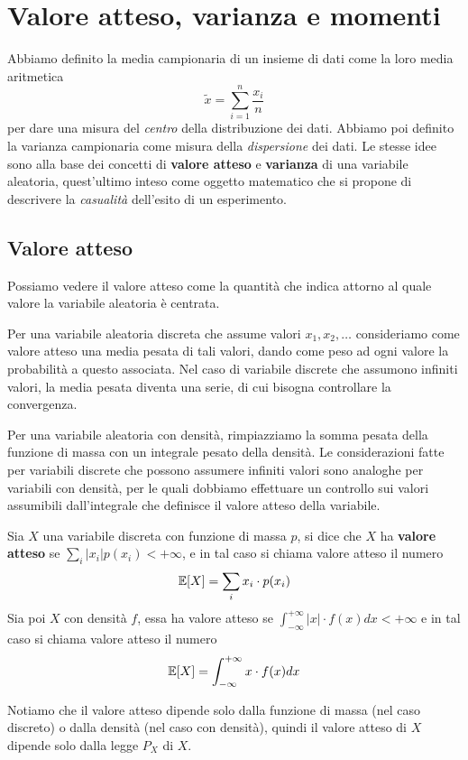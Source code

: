\section{Valore atteso, varianza e momenti}
Abbiamo definito la media campionaria di un insieme di dati come la loro media aritmetica
\[ \tilde{x} = \sum_{i=1}^n \frac{x_i}{n} \]
per dare una misura del \emph{centro} della distribuzione dei dati. Abbiamo poi definito la
varianza campionaria come misura della \emph{dispersione} dei dati. Le stesse idee sono alla base
dei concetti di \textbf{valore atteso} e \textbf{varianza} di una variabile aleatoria, quest'ultimo
inteso come oggetto matematico che si propone di descrivere la \emph{casualità} dell'esito di un
esperimento.

\subsection{Valore atteso}
Possiamo vedere il valore atteso come la quantità che indica attorno al quale valore la variabile
aleatoria è centrata.

Per una variabile aleatoria discreta che assume valori $x_1, x_2, \dots$ consideriamo come valore
atteso una media pesata di tali valori, dando come peso ad ogni valore la probabilità a questo
associata. Nel caso di variabile discrete che assumono infiniti valori, la media pesata diventa
una serie, di cui bisogna controllare la convergenza.

Per una variabile aleatoria con densità, rimpiazziamo la somma pesata della funzione di massa con
un integrale pesato della densità. Le considerazioni fatte per variabili discrete che possono
assumere infiniti valori sono analoghe per variabili con densità, per le quali dobbiamo effettuare
un controllo sui valori assumibili dall'integrale che definisce il valore atteso della variabile.

\begin{definition}
	Sia $X$ una variabile discreta con funzione di massa $p$, si dice che $X$ ha
	\textbf{valore atteso} se $\sum_i |x_i| p(x_i) < +\infty$, e in tal caso si chiama valore
	atteso il numero
	\[ \mathbb{E}[X] = \sum_i x_i \cdot p(x_i) \]
	Sia poi $X$ con densità $f$, essa ha valore atteso se
	$\int_{-\infty}^{+\infty} |x| \cdot f(x) dx < +\infty$ e in tal caso si chiama valore atteso
	il numero
	\[ \mathbb{E}[X] = \int_{-\infty}^{+\infty} x \cdot f(x) dx \]
\end{definition}

Notiamo che il valore atteso dipende solo dalla funzione di massa (nel caso discreto) o dalla
densità (nel caso con densità), quindi il valore atteso di $X$ dipende solo dalla legge $P_X$
di $X$.


